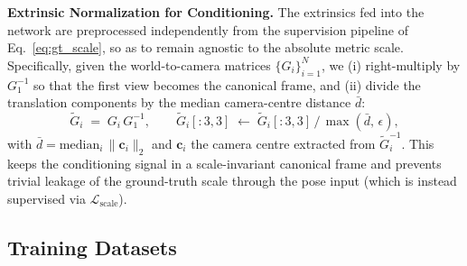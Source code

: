 \documentclass{llmxive}
\begin{document}
\noindent\textbf{Extrinsic Normalization for Conditioning.}
The extrinsics fed into the network are preprocessed independently from the supervision pipeline of Eq.~\eqref{eq:gt_scale}, so as to remain agnostic to the absolute metric scale. Specifically, given the world-to-camera matrices $\{G_i\}_{i=1}^{N}$, we (i) right-multiply by $G_1^{-1}$ so that the first view becomes the canonical frame, and (ii) divide the translation components by the median camera-centre distance $\bar{d}$:
\begin{equation}
\tilde{G}_i \;=\; G_i\,G_1^{-1},\qquad
\tilde{G}_i[{:}3,3] \;\leftarrow\; \tilde{G}_i[{:}3,3]\,/\,\max(\bar{d},\,\epsilon),
\end{equation}
with $\bar{d}=\mathrm{median}_i\,\|\mathbf{c}_i\|_2$ and $\mathbf{c}_i$ the camera centre extracted from $\tilde{G}_i^{-1}$. This keeps the conditioning signal in a scale-invariant canonical frame and prevents trivial leakage of the ground-truth scale through the pose input (which is instead supervised via $\mathcal{L}_{\text{scale}}$).

\subsection{Training Datasets}
\end{document}
